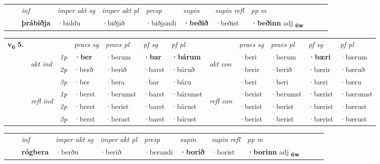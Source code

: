 \begin{tabular}{llllllllllll}
 & & \textit{inf} & \textit{imper akt sg} & \textit{imper akt pl}   & \textit{presp} & \textit{supin} & \textit{supin refl} & \textit{pp m}     \\*
  & & \textbf{þrábiðja} & ·biddu  & ·biðjið   & ·biðjandi &  \textbf{·beðið} & ·beðist & \textbf{·beðinn} adj \textbf{\textsubscript{6w}} \\*
\cmidrule{1-12}
\end{tabular}



\begin{tabular}{llllllllllll} \toprule
\multirow{4}{*}{{{\textbf{v{\textsubscript{6}}} \Large{\textbf{5.}}}}}  & &   &  \textit{praes sg}  & \textit{praes pl}  &\textit{ pf sg} & \textit{pf pl} &  &  \textit{praes sg}  & \textit{praes pl}  & \textit{pf sg} & \textit{pf pl } \\*
	\cmidrule{4-7} \cmidrule{9-12}
 & \multirow{3}{*}{\begin{turn}{90}\textit{akt ind}\end{turn}} & {\textit{1p}} & \textbf{·ber} & ·berum    & \textbf{·bar} & \textbf{·bárum} & \multirow{3}{*}{\begin{turn}{90}\textit{akt con}\end{turn}} &·beri & ·berum & \textbf{·bæri} & ·bærum\\*
& &  {\textit{2p}} &  ·berð  & ·berið   & ·barst & ·báruð & & ·berir & ·berið & ·bærir & ·bæruð \\*
& &  {\textit{3p}} & ·ber & ·bera   & ·bar & ·báru & & ·beri & ·beri& ·bæri & ·bæru  \\*
\cmidrule{4-7} \cmidrule{9-12}
 &\multirow{3}{*}{\begin{turn}{90}\textit{refl ind}\end{turn}} & {\textit{1p}} & ·berst & ·berumst    & ·barst & ·bárumst & \multirow{3}{*}{\begin{turn}{90}\textit{refl con}\end{turn}}  &·berist & ·berumst & ·bærist & ·bærumst\\*
 &&  {\textit{2p}} &  ·berst  & ·berist   & ·barst & ·bárust & &·berist & ·berist & ·bærist & ·bærust \\*
& &  {\textit{3p}} & ·berst & ·berast   & ·barst & ·bárust & & ·berist & ·berist& ·bærist & ·bærust  \\*
\cmidrule{4-7} \cmidrule{9-12}
\end{tabular}


\begin{tabular}{llllllllllll}
 & & \textit{inf} & \textit{imper akt sg} & \textit{imper akt pl}   & \textit{presp} & \textit{supin} & \textit{supin refl} & \textit{pp m}     \\*
  & & \textbf{rógbera} & ·berðu  & ·berið   & ·berandi &  \textbf{·borið} & ·borist & \textbf{·borinn} adj \textbf{\textsubscript{6w}} \\*
\cmidrule{1-12}
\end{tabular}



